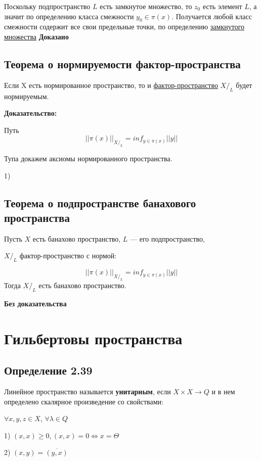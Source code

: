 \documentclass[12pt]{article}
\begin{document}
 Поскольку подпространство $L$ есть замкнутое множество,
то $z_0$ есть элемент $L$, а значит по определению класса смежности $y_0 \in \pi(x)$. Получается любой класс смежности содержит все свои предельные точки, по определению \hyperref[eq101]{замкнутого множества} \textbf{Доказано}
	
\subsection{Теорема о нормируемости фактор-пространства}
	Если X есть нормированное пространство,
то и \hyperref[eq102]{фактор-пространство} $X\text{/}_L$ будет нормируемым.
		
\textbf{Доказательство:} 

	Путь $$||\pi(x)||_{X\text{/}_L} = inf_{y \in \pi(x)} ||y|| $$
	
Тупа докажем аксиомы нормированного пространства.

1) 	
	
	
	
	
\subsection{Теорема о подпространстве банахового пространства}

	Пусть $X$ есть банахово пространство, $L$ — его подпространство, 
	
	${X\text{/}_L}$  фактор-пространство 	с нормой:
	

		$$||\pi(x)||_{X\text{/}_L} = inf_{y \in \pi(x)} ||y|| $$
Тогда $X\text{/}_L$ есть банахово пространство.
	
		
	\textbf{Без доказательства}
	
\newpage
\section{Гильбертовы пространства}

\subsection{Определение 2.39}
	Линейное пространство называется \textbf{унитарным},
	 если $X \times X \to Q$ и в нем определено скалярное произведение со свойствами:
	
	$\forall x,y,z \in X$, $\forall \lambda \in Q$	
	
	1) $(x, x) \ge 0, (x, x) = 0 \Leftrightarrow x = \Theta$
	
	2) $(x, y) = \overline{(y, x)}$
	
\end{document}
